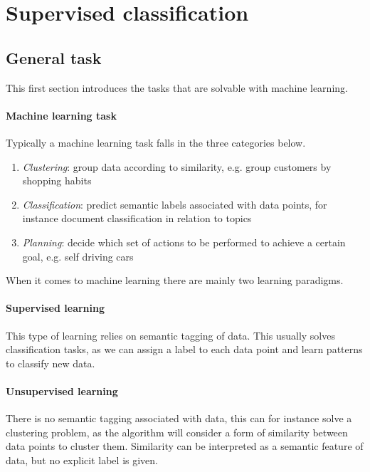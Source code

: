 \section{Supervised classification}

\subsection{General task}
This first section introduces the tasks that are solvable with machine learning.

\paragraph{Machine learning task}
Typically a machine learning task falls in the three categories below.
\begin{enumerate}
    \item \emph{Clustering}: group data according to similarity, e.g. group customers by 
    shopping habits
    \item \emph{Classification}: predict semantic labels associated with data points, 
    for instance document classification in relation to topics
    \item \emph{Planning}: decide which set of actions to be performed to achieve a 
    certain goal, e.g. self driving cars
\end{enumerate}

When it comes to machine learning there are mainly two learning paradigms.

\paragraph{Supervised learning}
This type of learning relies on semantic tagging of data.
This usually solves classification tasks, as we can assign a label to each data point 
and learn patterns to classify new data.

\paragraph{Unsupervised learning}
There is no semantic tagging associated with data, this can for instance solve a clustering 
problem, as the algorithm will consider a form of similarity between data points 
to cluster them. 
Similarity can be interpreted as a semantic feature of data, but no explicit label is given.